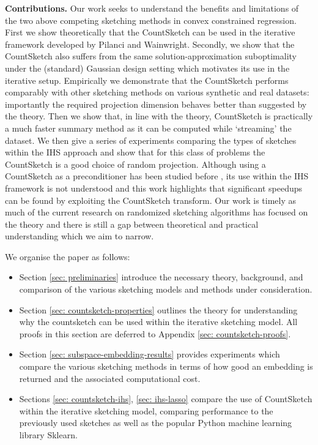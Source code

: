 \textbf{Contributions.}
Our work seeks to understand the benefits and limitations of the two
above competing sketching methods in convex constrained regression.
First we show theoretically that the CountSketch can be used in the iterative
framework developed by Pilanci and Wainwright.
Secondly, we show that the CountSketch also suffers from the same
 solution-approximation
suboptimality under the (standard) Gaussian design setting which motivates its
use in the iterative setup.
Empirically we demonstrate that the CountSketch performs comparably with
other sketching methods on various synthetic and real datasets:
importantly the required projection dimension behaves better than suggested by
the theory.
Then we show that, in line with the theory, CountSketch is practically a much
faster summary method as it can be computed while `streaming' the dataset.
We then give a series of experiments comparing the types of sketches within the
IHS approach and show that for this class of problems the CountSketch is a good
choice of random projection.
Although using a CountSketch as a preconditioner has been studied before
\cite{dahiya2018empirical}, its use
within the IHS framework is not understood and this work highlights that
significant
speedups can be found by exploiting the CountSketch transform.
Our work is timely as much of the current research on randomized sketching
 algorithms
has focused on the theory and there is still a gap between theoretical and
practical understanding which we aim to narrow.

We organise the paper as follows:
\begin{itemize}
  \item Section \ref{sec: preliminaries} introduce the necessary theory, background,
  and comparison of the various sketching models and methods under consideration.

  \item Section \ref{sec: countsketch-properties} outlines the theory for
  understanding why the countsketch can be used within the iterative sketching
  model.
  All proofs in this section are deferred to Appendix \ref{sec: countsketch-proofs}.

  \item  Section \ref{sec: subspace-embedding-results} provides experiments
  which compare the various sketching methods in terms of how good an embedding
  is returned and the associated computational cost.
  
  \item Sections \ref{sec: countsketch-ihs}, \ref{sec: ihs-lasso} compare the
  use of CountSketch
  within the iterative sketching model, comparing performance to the previously
  used sketches as well as the popular Python machine learning library Sklearn.
\end{itemize}
